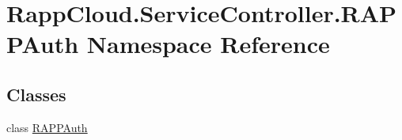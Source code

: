 \hypertarget{namespaceRappCloud_1_1ServiceController_1_1RAPPAuth}{\section{Rapp\-Cloud.\-Service\-Controller.\-R\-A\-P\-P\-Auth Namespace Reference}
\label{namespaceRappCloud_1_1ServiceController_1_1RAPPAuth}
}
\subsection*{Classes}
\begin{DoxyCompactItemize}
\item 
class \hyperlink{classRappCloud_1_1ServiceController_1_1RAPPAuth_1_1RAPPAuth}{R\-A\-P\-P\-Auth}
\end{DoxyCompactItemize}
